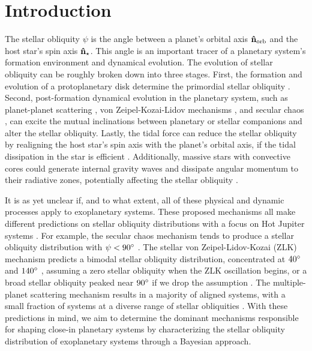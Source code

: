 \documentclass[twocolumn,times,linenumbers]{aastex631}
\begin{document}

\section{Introduction}
\label{sec:intro}

The stellar obliquity $\psi$ is the angle between a planet's orbital axis $\vb{\hat{n}_{\rm orb}}$ and the host star's spin axis $\vb{\hat{n}_\star}$. 
This angle is an important tracer of a planetary system's formation environment and dynamical evolution. The evolution of stellar obliquity can be roughly broken down into three stages. First, the formation and evolution of a protoplanetary disk determine the primordial stellar obliquity \citep[e.g.,][]{Bate10, Lai11, Batygin12}. Second, post-formation dynamical evolution in the planetary system, such as planet-planet scattering \citep[e.g.,][]{Rasio96, Chatterjee08, Nagasawa08, Beague12}, von Zeipel-Kozai-Lidov mechanisms \citep[e.g.,][]{Wu03, Naoz16}, and secular chaos \citep{Wu11}, can excite the mutual inclinations between planetary or stellar companions and alter the stellar obliquity. Lastly, the tidal force can reduce the stellar obliquity by realigning the host star's spin axis with the planet's orbital axis, if the tidal dissipation in the star is efficient \citep[e.g.,][]{Winn10, Albrecht12}. Additionally, massive stars with convective cores could generate internal gravity waves and dissipate angular momentum to their radiative zones, potentially affecting the stellar obliquity \citep{Rogers12, Rogers13}.

It is as yet unclear if, and to what extent, all of these physical and dynamic processes apply to exoplanetary systems. These proposed mechanisms all make different predictions on stellar obliquity distributions with a focus on Hot Jupiter systems \citep[see][and references therein]{Albrecht22, Dawson18}. For example, the secular chaos mechanism tends to produce a stellar obliquity distribution with $\psi < 90\mbox{$^\circ$}$ \citep[e.g.,][]{Teyssandier19}. The stellar von Zeipel-Lidov-Kozai (ZLK) mechanism predicts a bimodal stellar obliquity distribution, concentrated at $40\mbox{$^\circ$}$ and $140\mbox{$^\circ$}$ \citep[e.g.,][]{Fabrycky07, Anderson16, Vick19}, assuming a zero stellar obliquity when the ZLK oscillation begins, or a broad stellar obliquity peaked near $90\mbox{$^\circ$}$ if we drop the assumption \citep{Vick23}. The multiple-planet scattering mechanism results in a majority of aligned systems, with a small fraction of systems at a diverse range of stellar obliquities \citep[e.g.,][]{Beague12}. 
With these predictions in mind, we aim to determine the dominant mechanisms responsible for shaping close-in planetary systems by characterizing the stellar obliquity distribution of exoplanetary systems through a Bayesian approach.
\end{document}

